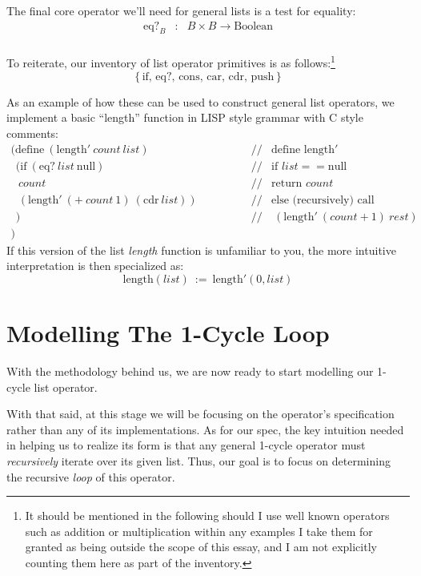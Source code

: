 \documentclass[twoside]{article}
\newcommand{\twoqquad}{\ensuremath{\qquad\qquad}}
\newcommand{\cdr}{\mbox{cdr}}
\newcommand{\eq}{\mbox{eq?}}
\begin{document}
The final core operator we'll need for general lists is a test for equality:
$$ \begin{array}{rcl}
\eq_B		& :	& B \times B \to \mbox{Boolean}		\\
\end{array} $$

To reiterate, our inventory of list operator primitives is as follows:\footnote{It should be mentioned in the following
should I use well known operators such as addition or multiplication within any examples I take them for granted
as being outside the scope of this essay, and I am not explicitly counting them here as part of the inventory.}
$$ \{\,\mbox{if, eq?, cons, car, cdr, push}\,\} $$

As an example of how these can be used to construct general list operators, we implement
a basic ``length'' function in LISP style grammar with C style comments:
$$ \begin{array}{lrl}
(\mbox{define}\ (\mbox{length}'\ count\ list)			& \twoqquad // & \mbox{define length}'			\\
\ \ (\mbox{if}\ (\eq\ list\ \mbox{null})			& \twoqquad // & \mbox{if } list == \mbox{null}		\\
\ \           \ count						& \twoqquad // & \mbox{return } count			\\
\ \           \ (\mbox{length}'\ (+\ count\ 1)\ (\cdr\ list))	& \twoqquad // & \mbox{else (recursively) call }	\\
\ \ )								& \twoqquad // & \ (\mbox{length}'\ (count + 1)\ rest)	\\
)
\end{array} $$
If this version of the list \emph{length} function is unfamiliar to you,
the more intuitive interpretation is then specialized as:
$$ \mbox{length}(list)\ :=\ \mbox{length}'(0, list) $$

\section*{Modelling The 1-Cycle Loop}

With the methodology behind us, we are now ready to start modelling our 1-cycle list operator.

With that said, at this stage we will be focusing on the operator's specification rather than any of its implementations.
As for our spec, the key intuition needed in helping us to realize its form is that any general 1-cycle operator must
\emph{recursively} iterate over its given list. Thus, our goal is to focus on determining the recursive
\emph{loop} of this operator.
\end{document}
